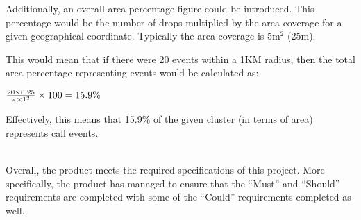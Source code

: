 Additionally, an overall area percentage figure could be introduced. This 
percentage would be the number of drops multiplied by the area coverage for a
given geographical coordinate. Typically the area coverage is 5m$^2$ (25m). 

This would mean that if there were 20 events within a 1KM radius, then the 
total area percentage representing events would be calculated as:

\begin{center}
  $ \large \frac{20 \times 0.25}{\pi \times 1^2} \times 100 = 15.9\% $
\end{center}

Effectively, this means that 15.9\% of the given cluster (in terms of area) 
represents call events.

~\\

Overall, the product meets the required specifications of this project. More 
specifically, the product has managed to ensure that the ``Must'' and 
``Should'' requirements are completed with some of the ``Could'' requirements
completed as well.
